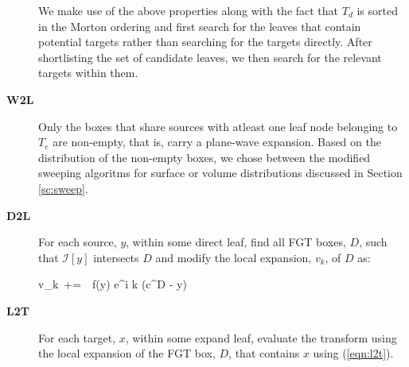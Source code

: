 \begin{description}
 We make use of the above properties along with the fact that $T_d$ is sorted in the Morton ordering and
 first search for the leaves that contain potential targets rather than searching for the targets directly. After
 shortlisting the set of candidate leaves, we then search for the relevant targets within them.

\item[\textbf{W2L}] Only the boxes that share sources with atleast one leaf node belonging to $T_e$ are non-empty, that is, carry a plane-wave expansion. Based on the distribution of the non-empty boxes, we chose between the modified sweeping algoritms for surface or volume distributions discussed in Section \ref{sc:sweep}. 

\item[\textbf{D2L}] For each source, $y$, within some direct leaf, find all FGT boxes, $D$, such that $\mathcal{I}[y]$ intersects $D$ and
modify the local expansion, $v_k$, of $D$ as: 

\beq v_k  \,+=\, \, f(y) e^{i \lambda k \cdot (c^D - y)} \label{eqn:d2l} \eeq

\item[\textbf{L2T}] For each target, $x$, within some expand leaf, evaluate the transform using the local 
expansion of the FGT box, $D$, that contains $x$ using (\ref{eqn:l2t}).
\end{description}



